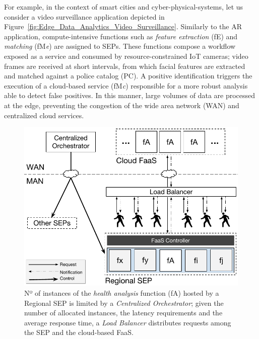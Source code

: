 For example, in the context of smart cities and cyber-physical-systems, let us consider a video surveillance application 
depicted in Figure~\ref{fig:Edge_Data_Analytics_Video_Surveillance}. Similarly to the AR application, compute-intensive functions such as \textit{feature extraction} (fE) and \textit{matching} (fM\textit{e}) are assigned to SEPs.
These functions compose a workflow exposed as a service and consumed by resource-constrained IoT cameras; video frames are received at short intervals, from which facial features are extracted and matched against a police catalog (PC). A positive identification triggers the execution of a cloud-based service (fM\textit{c}) responsible for a more robust analysis able to detect false positives. In this manner, large volumes of data are processed at the edge, preventing the congestion of the wide area network (WAN) and centralized cloud services.

\begin{figure}[tbp]
	\centering
	\includegraphics[width=\linewidth]{Figs/Edge_Data_Analytics_Personal_Assistant.pdf}
	\caption{Nº of instances of the \textit{health analysis} function (fA) hosted by a Regional SEP is limited by a \textit{Centralized Orchestrator}; given the number of allocated instances, the latency requirements and the average response time, a \textit{Load Balancer} distributes requests among the SEP and the cloud-based FaaS.}
	\label{fig:Edge_Data_Analytics_Personal_Assistant}
\end{figure}


